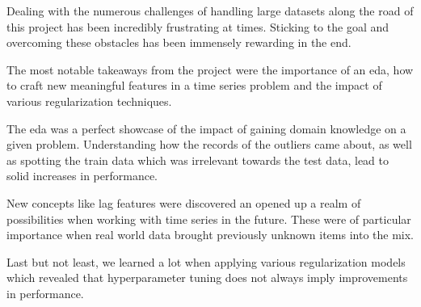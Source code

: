 Dealing with the numerous challenges of handling large datasets along the road of this project has been incredibly frustrating at times. Sticking to the goal and overcoming these obstacles has been immensely rewarding in the end.

The most notable takeaways from the project were the importance of an \acrshort{eda}, how to craft new meaningful features in a time series problem and the impact of various regularization techniques.

The \acrshort{eda} was a perfect showcase of the impact of gaining domain knowledge on a given problem. Understanding how the records of the outliers came about, as well as spotting the train data which was irrelevant towards the test data, lead to solid increases in performance.

New concepts like lag features were discovered an opened up a realm of possibilities when working with time series in the future. These were of particular importance when real world data brought previously unknown items into the mix.

Last but not least, we learned a lot when applying various regularization models which revealed that \gls{hyperparameter} tuning does not always imply improvements in performance.
